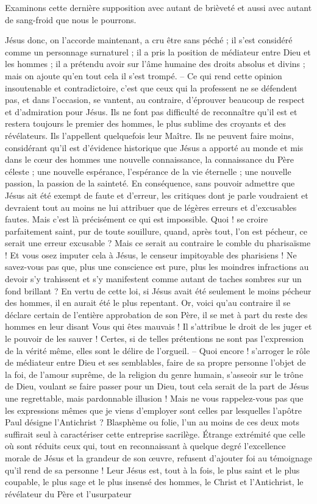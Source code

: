 Examinons cette dernière supposition avec autant de brièveté et aussi avec autant de sang-froid que nous le pourrons.

Jésus donc, on l’accorde maintenant, a cru être sans péché ; il s’est considéré comme un personnage surnaturel ; il a pris la position de médiateur entre Dieu et les hommes ; il a prétendu avoir sur l’âme humaine des droits absolus et divins ; mais on ajoute qu’en tout cela il s’est trompé. – Ce qui rend cette opinion insoutenable et contradictoire, c’est que ceux qui la professent ne se défendent pas, et dans l’occasion, se vantent, au contraire, d’éprouver beaucoup de respect et d’admiration pour Jésus. Ils ne font pas difficulté de reconnaître qu’il est et restera toujours le premier des hommes, le plus sublime des croyants et des révélateurs. Ils l’appellent quelquefois leur Maître. Ils ne peuvent faire moins, considérant qu’il est d’évidence historique que Jésus a apporté au monde et mis dans le cœur des hommes une nouvelle connaissance, la connaissance du Père céleste ; une nouvelle espérance, l’espérance de la vie éternelle ; une nouvelle passion, la passion de la sainteté. En conséquence, sans pouvoir admettre que Jésus ait été exempt de faute et d’erreur, les critiques dont je parle voudraient et devraient tout au moins ne lui attribuer que de légères erreurs et d’excusables fautes. Mais c’est là précisément ce qui est impossible. Quoi ! se croire parfaitement saint, pur de toute souillure, quand, après tout, l’on est pécheur, ce serait une erreur excusable ? Mais ce serait au contraire le comble du pharisaïsme ! Et vous osez imputer cela à Jésus, le censeur impitoyable des pharisiens ! Ne savez-vous pas que, plus une conscience est pure, plus les moindres infractions au devoir s’y trahissent et s’y manifestent comme autant de taches sombres sur un fond brillant ? En vertu de cette loi, si Jésus avait été seulement le moins pécheur des hommes, il en aurait été le plus repentant. Or, voici qu’au contraire il se déclare certain de l’entière approbation de son Père, il se met à part du reste des hommes en leur disant\frcolon{} \Og{} Vous qui êtes mauvais !\Fg{} Il s’attribue le droit de les juger et le pouvoir de les sauver ! Certes, si de telles prétentions ne sont pas l’expression de la vérité même, elles sont le délire de l’orgueil. – Quoi encore ! s’arroger le rôle de médiateur entre Dieu et ses semblables, faire de sa propre personne l’objet de la foi, de l’amour suprême, de la religion du genre humain, s’asseoir sur le trône de Dieu, voulant se faire passer pour un Dieu, tout cela serait de la part de Jésus une regrettable, mais pardonnable illusion ! Mais ne vous rappelez-vous pas que les expressions mêmes que je viens d’employer sont celles par lesquelles l’apôtre Paul désigne l’Antichrist ? Blasphème ou folie, l’un au moins de ces deux mots suffirait seul à caractériser cette entreprise sacrilège. Étrange extrémité que celle où sont réduits ceux qui, tout en reconnaissant à quelque degré l’excellence morale de Jésus et la grandeur de son œuvre, refusent d’ajouter foi au témoignage qu’il rend de sa personne ! Leur Jésus est, tout à la fois, le plus saint et le plus coupable, le plus sage et le plus insensé des hommes, le Christ et l’Antichrist, le révélateur du Père et l’usurpateur 